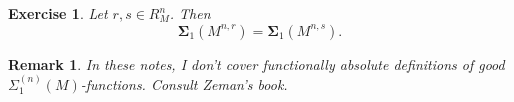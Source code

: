\documentclass[12pt,a4paper]{article}
\theoremstyle{nicestyle}
\newtheorem{exercise}{Exercise}[subsection]
\newtheorem{definition}{Definition}[subsection]
\newtheorem{lemma}{Lemma}[subsection]
\newtheorem{claim}{Claim}[subsection]
\newtheorem{remark}{Remark}[subsection]
\begin{document}
\begin{exercise}
  Let $r,s \in R^{n}_{M}$. Then
  \[
    \boldsymbol{\Sigma}_{1}(M^{n,r}) =
    \boldsymbol{\Sigma}_{1}(M^{n,s}).
  \]
\end{exercise}

\begin{remark}
  In these notes, I don't cover functionally absolute definitions of
  good $\Sigma^{(n)}_1(M)$-functions. Consult Zeman's book.
\end{remark}




\end{document}
